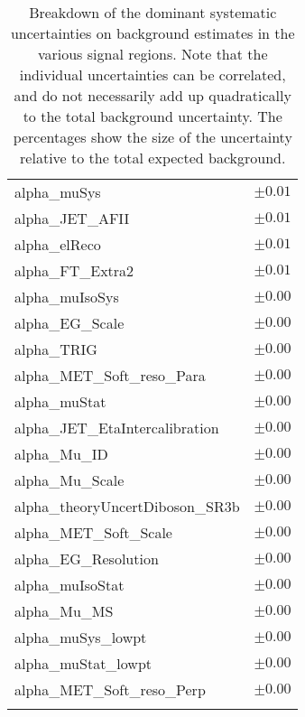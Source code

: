 \begin{table}
\begin{center}
\begin{tabular*}{\textwidth}{@{\extracolsep{\fill}}lc}
alpha\_muSys         & $\pm 0.01$       \\
alpha\_JET\_AFII         & $\pm 0.01$       \\
alpha\_elReco         & $\pm 0.01$       \\
alpha\_FT\_Extra2         & $\pm 0.01$       \\
alpha\_muIsoSys         & $\pm 0.00$       \\
alpha\_EG\_Scale         & $\pm 0.00$       \\
alpha\_TRIG         & $\pm 0.00$       \\
alpha\_MET\_Soft\_reso\_Para         & $\pm 0.00$       \\
alpha\_muStat         & $\pm 0.00$       \\
alpha\_JET\_EtaIntercalibration         & $\pm 0.00$       \\
alpha\_Mu\_ID         & $\pm 0.00$       \\
alpha\_Mu\_Scale         & $\pm 0.00$       \\
alpha\_theoryUncertDiboson\_SR3b         & $\pm 0.00$       \\
alpha\_MET\_Soft\_Scale         & $\pm 0.00$       \\
alpha\_EG\_Resolution         & $\pm 0.00$       \\
alpha\_muIsoStat         & $\pm 0.00$       \\
alpha\_Mu\_MS         & $\pm 0.00$       \\
alpha\_muSys\_lowpt         & $\pm 0.00$       \\
alpha\_muStat\_lowpt         & $\pm 0.00$       \\
alpha\_MET\_Soft\_reso\_Perp         & $\pm 0.00$       \\
\noalign{\smallskip}\hline\noalign{\smallskip}
\end{tabular*}
\end{center}
\caption[Breakdown of uncertainty on background estimates]{
Breakdown of the dominant systematic uncertainties on background estimates in the various signal regions.
Note that the individual uncertainties can be correlated, and do not necessarily add up quadratically to 
the total background uncertainty. The percentages show the size of the uncertainty relative to the total expected background.
\label{table.results.bkgestimate.uncertainties.SR3b}}
\end{table}
%